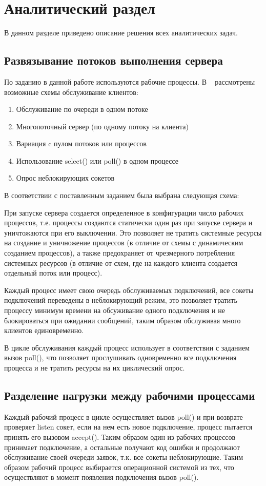\chapter{Аналитический раздел}
В данном разделе приведено описание решения всех аналитических задач.


\section{Развязывание потоков выполнения сервера}

По заданию в данной работе используются рабочие процессы.
В ~\cite{Krisch1} рассмотрены возможные схемы обслуживание клиентов:

\begin{enumerate}
\item Обслуживание по очереди в одном потоке
\item Многопоточный сервер (по одному потоку на клиента)
\item Вариация c пулом потоков или процессов
\item Использование select() или poll() в одном процессе
\item Опрос неблокирующих сокетов
\end{enumerate}

В соответствии с поставленным заданием была выбрана следующая схема:

При запуске сервера создается определенное в конфигурации число рабочих процессов,
т.е. процессы создаются статически один раз при запуске сервера и уничтожаются при его выключении.
Это позволяет не тратить системные ресурсы на создание и уничножение процессов (в отличие от схемы с динамическим созданием процессов), а также предохраняет от чрезмерного потребления системных ресурсов (в отличие от схем, где на каждого клиента создается отдельный поток или процесс).

Каждый процесс имеет свою очередь обслуживаемых подключений, все сокеты подключений переведены в неблокирующий режим, это позволяет тратить процессу минимум времени на обсуживание одного подключения и не блокироваться при ожидании сообщений, таким образом обслуживая много клиентов единовременно.

В цикле обслуживания каждый процесс использует в соответствии с заданием вызов poll(), что позволяет прослушивать одновременно
все подключения процесса и не тратить ресурсы на их циклический опрос.




\section{Разделение нагрузки между рабочими процессами}
Каждый рабочий процесс в цикле осуществляет вызов poll() и при возврате проверяет listen сокет, если на нем есть новое подключение, процесс пытается принять его вызовом accept(). Таким образом один из рабочих процессов принимает подключение, а остальные получают код ошибки и продолжают обслуживание своей очереди заявок, т.к. все сокеты неблокирующие.
Таким образом рабочий процесс выбирается операционной системой из тех, что осуществляют в момент появления подключения вызов poll().



